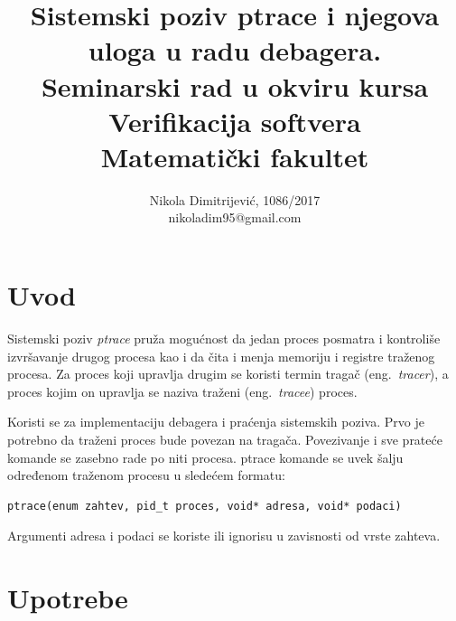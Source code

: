 \documentclass[a4paper]{article}
\begin{document}
\title{Sistemski poziv ptrace i njegova uloga u radu debagera.\\ \small{Seminarski rad u okviru kursa\\Verifikacija softvera\\ Matematički fakultet}}

\author{Nikola Dimitrijević, 1086/2017\\ nikoladim95@gmail.com}
\maketitle

    
\tableofcontents

\newpage
\section{Uvod}
\label{sec:uvod}
Sistemski poziv \emph{ptrace} pruža mogućnost da jedan proces posmatra
i kontroliše izvršavanje drugog procesa kao i da čita i menja
memoriju i registre traženog procesa. Za proces koji upravlja drugim se koristi termin tragač (eng.~{\em tracer}), a
proces kojim on upravlja se naziva traženi  (eng.~{\em tracee}) proces.

Koristi se za implementaciju debagera i praćenja sistemskih poziva.
Prvo je potrebno da traženi proces bude povezan na tragača. Povezivanje i sve prateće komande se
zasebno rade po niti procesa. ptrace komande se uvek šalju određenom traženom procesu u sledećem formatu:

\begin{verbatim}
ptrace(enum zahtev, pid_t proces, void* adresa, void* podaci)
\end{verbatim}

Argumenti adresa i podaci se koriste ili ignorisu u zavisnosti od vrste zahteva.
\section{Upotrebe}
\end{document}
